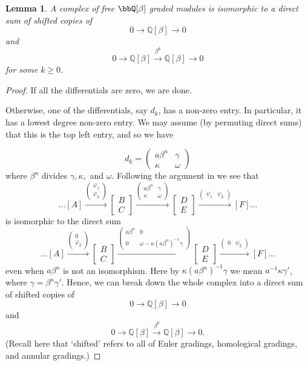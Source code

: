 \documentclass{amsart}
\theoremstyle{plain}
\newtheorem{lem}[prop]{Lemma}
\newcommand{\complexzero}{0\rightarrow\mathbb Q [\beta]\rightarrow 0}
\newcommand{\complexk}[1]{0\rightarrow\mathbb Q [\beta]\xrightarrow{\beta^{#1}}{}\mathbb Q [\beta]\rightarrow 0}
\begin{document}
\begin{lem}
A complex of free $\bbQ[\beta]$ graded modules is isomorphic to a direct sum of shifted copies of
\[
\complexzero
\]
and
\[
\complexk{k}
\]
for some $k \geq 0$.

\end{lem}
\begin{proof}
If all the differentials are zero, we are done.

Otherwise, one of the differentials, say $d_k$, has a non-zero entry. In particular, it has a lowest degree non-zero entry. We may assume (by permuting direct sums) that this is the top left entry, and so we have

\[
d_k=\left(
\begin{array}{c|c}
a\beta^n&\gamma\\ \hline
\kappa &\omega
\end{array}
\right)
\]
where $\beta^n$ divides $\gamma,\kappa,$ and $\omega$.
Following the argument in \cite[Lemma 4.2]{math.GT/0606318} 
we see that 
\[
...[A]
\xrightarrow{\left(\begin{array}{c}\varphi_1 \\ \varphi_2\end{array}\right)}
\left[\begin{array}{c}B \\ C\end{array}\right]
\xrightarrow{\left(
\begin{array}{cc}
a\beta^n&\gamma\\
\kappa &\omega
\end{array}
\right)}
\left[\begin{array}{c}D \\ E\end{array}\right]
\xrightarrow{\left(\begin{array}{cc}\psi_1 & \psi_2\end{array}\right)}
[F]...
\]
is isomorphic to the direct sum 
\[
...[A]
\xrightarrow{\left(\begin{array}{c}0 \\ \varphi_2\end{array}\right)}
\left[\begin{array}{c}B \\ C\end{array}\right]
\xrightarrow{\left(
\begin{array}{cc}
a\beta^n&0\\
0 &\omega-\kappa (a\beta^{n})^{-1} \gamma
\end{array}
\right)}
\left[\begin{array}{c}D \\ E\end{array}\right]
\xrightarrow{\left(\begin{array}{cc}0 & \psi_2\end{array}\right)}
[F]...
\]
even when $a\beta^n$ is not an isomorphism. Here by $\kappa (a\beta^{n})^{-1} \gamma$ we mean $a^{-1} \kappa \gamma'$, where $\gamma = \beta^n \gamma'$.  Hence, we can break down the whole complex into a direct sum of shifted copies of
\[
\complexzero
\]
and
\[
\complexk{k}.
\]
(Recall here that `shifted' refers to all of Euler gradings, homological gradings, and annular gradings.)%
\end{proof}
\end{document}
